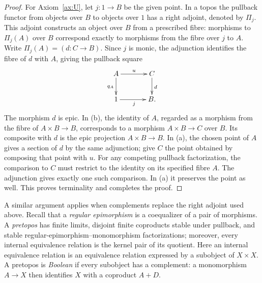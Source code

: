 \documentclass[11pt,a4paper]{article}
\theoremstyle{plain}
\theoremstyle{definition}
\theoremstyle{remark}
\begin{document}
\begin{proof}
For Axiom~\ref{ax:U}, let $j:1\to B$ be the given point.
In a topos the pullback functor from objects over $B$ to objects
over $1$ has a right adjoint, denoted by $\Pi_j$. This adjoint
constructs an object over $B$ from a prescribed fibre: morphisms
to $\Pi_j(A)$ over $B$ correspond exactly to morphisms from the
fibre over $j$ to $A$. Write $\Pi_j(A)=(d:C\to B)$.
Since $j$ is monic, the adjunction identifies the fibre of $d$
with $A$, giving the pullback square
\[
\xymatrix@C=3.5em@R=2.3em{
A\ar[r]^u\ar[d]_{q_A}&C\ar[d]^d\\
1\ar[r]_j&B.
}
\]
The morphism $d$ is epic. In (b), the identity of $A$, regarded
as a morphism from the fibre of $A\times B\to B$, corresponds
to a morphism $A\times B\to C$ over $B$. Its composite with
$d$ is the epic projection $A\times B\to B$. In (a), the
chosen point of $A$ gives a section of $d$ by the same adjunction;
give $C$ the point obtained by composing that point with $u$.
For any competing pullback factorization, the comparison to $C$
must restrict to the identity on its specified fibre $A$.
The adjunction gives exactly one such comparison. In (a) it
preserves the point as well. This proves terminality and completes
the proof.
\end{proof}

A similar argument applies when complements replace the right
adjoint used above. Recall that a \emph{regular epimorphism} is a
coequalizer of a pair of morphisms. A \emph{pretopos} has finite
limits, disjoint finite coproducts stable under pullback, and stable
regular-epimorphism--monomorphism factorizations; moreover, every
internal equivalence relation is the kernel pair of its quotient.
Here an internal equivalence relation is an equivalence relation
expressed by a subobject of $X\times X$. A pretopos is
\emph{Boolean} if every subobject has a complement: a monomorphism
$A\to X$ then identifies $X$ with a coproduct $A+D$.
\end{document}
